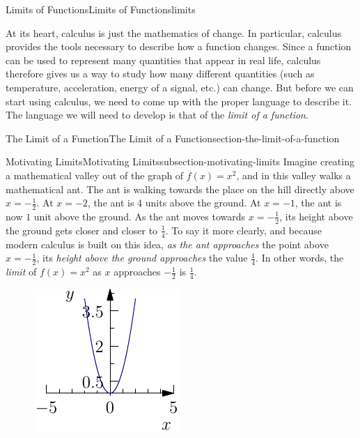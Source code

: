 \documentclass[oneside,10pt,]{book}
\numberwithin{equation}{section}
\begin{document}
%
%
\typeout{************************************************}
\typeout{************************************************}
%
\begin{chapterptx}{Limits of Functions}{}{Limits of Functions}{}{}{limits}
\begin{introduction}{}%
\hypertarget{p-1}{}%
At its heart, calculus is just the mathematics of change. In particular, calculus provides the tools necessary to describe how a function changes. Since a function can be used to represent many quantities that appear in real life, calculus therefore gives us a way to study how many different quantities (such as temperature, acceleration, energy of a signal, etc.) can change. But before we can start using calculus, we need to come up with the proper language to describe it. The language we will need to develop is that of the \emph{limit of a function}.%
\end{introduction}%
%
%
\typeout{************************************************}
\typeout{************************************************}
%
\begin{sectionptx}{The Limit of a Function}{}{The Limit of a Function}{}{}{section-the-limit-of-a-function}
%
%
\typeout{************************************************}
\typeout{************************************************}
%
\begin{subsectionptx}{Motivating Limits}{}{Motivating Limits}{}{}{subsection-motivating-limits}
\hypertarget{p-2}{}%
Imagine creating a mathematical valley out of the graph of \(f(x) = x^{2}\), and in this valley walks a mathematical ant. The ant is walking towards the place on the hill directly above \(x = -\frac{1}{2}\). At \(x=-2\), the ant is \(4\) units above the ground. At \(x=-1\), the ant is now \(1\) unit above the ground. As the ant moves towards \(x=-\frac{1}{2}\), its height above the ground gets closer and closer to \(\frac{1}{4}\). To say it more clearly, and because modern calculus is built on this idea, \emph{as the ant approaches} the point above \(x = -\frac{1}{2}\), its \emph{height above the ground approaches} the value \(\frac{1}{4}\). In other words, the \emph{limit} of \(f(x) = x^{2}\) as \(x\) approaches \(-\frac{1}{2}\) is \(\frac{1}{4}\).%
\begin{figure}
\centering
\includegraphics[width=0.5\linewidth]{images/image-1.pdf}

\end{figure}
\end{subsectionptx}
\end{sectionptx}
\end{chapterptx}
\end{document}
